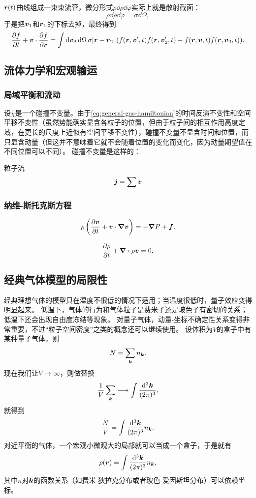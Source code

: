\documentclass[hyperref, UTF8, a4paper]{ctexart}
\begin{document}
$\vb*{r}(t)$曲线组成一束束流管，微分形式$\rho \dd{\rho} \dd{\varphi}$实际上就是散射截面：
\[
    \rho \dd{\rho} \dd{\varphi} = \sigma \dd{\Omega},
\]
于是把$\vb*{v}_1$和$\vb*{r}_1$的下标去掉，最终得到
\begin{equation}
    \pdv{f}{t} + \vb*{v} \cdot \pdv{f}{\vb*{r}} = \int \dd{\vb*{v}_2} \dd{\Omega} \sigma \abs*{\vb*{r}-\vb*{r}_2} (f(\vb*{r}, \vb*{v}', t) f(\vb*{r}, \vb*{v}'_{2}, t) - f(\vb*{r}, \vb*{v}, t) f(\vb*{r}, \vb*{v}_{2}, t)).
\end{equation}

\subsection{流体力学和宏观输运}

\subsubsection{局域平衡和流动}

设$\chi$是一个碰撞不变量。由于\eqref{eq:general-gas-hamiltonian}的时间反演不变性和空间平移不变性（虽然势能确实显含各粒子的位置，但由于粒子间的相互作用高度定域，在更长的尺度上近似有空间平移不变性），碰撞不变量不显含时间和位置，而只显含动量（但这并不意味着它就不会随着位置的变化而变化，因为动量期望值在不同位置可以不同）。
碰撞不变量是这样的：

粒子流
\[
    \vb*{j} = \sum \vb*{v}
\]

\subsubsection{纳维-斯托克斯方程}

\begin{equation}
    \rho \left( \pdv{\vb*{v}}{t} + \vb*{v} \cdot \grad{\vb*{v}} \right) = - \grad{P} + \vb*{f}.
\end{equation}

\begin{equation}
    \pdv{\rho}{t} + \div{\rho \vb*{v}} = 0.
    \label{eq:transportation-eq}
\end{equation}

\subsection{经典气体模型的局限性}

经典理想气体的模型只在温度不很低的情况下适用；当温度很低时，量子效应变得明显起来。
低温下，气体的行为和气体粒子是费米子还是玻色子有密切的关系；低温下还会出现自由度冻结等现象。
对量子气体，动量-坐标不确定性关系变得非常重要，不过“粒子空间密度”之类的概念还可以继续使用。
设体积为$V$的盒子中有某种量子气体，则
\[
    N = \sum_{\vb*{k}} n_{\vb*{k}}.
\]
现在我们让$V\to \infty$，则做替换
\[
    \frac{1}{V} \sum_{\vb*{k}} \longrightarrow \int \frac{\dd[3]{\vb*{k}}}{(2\pi)^3},
\]
就得到
\[
    \frac{N}{V} = \int \frac{\dd[3]{\vb*{k}}}{(2\pi)^3} n_{\vb*{k}}.
\]
对近平衡的气体，一个宏观小微观大的局部就可以当成一个盒子，于是就有
\begin{equation}
    \rho(\vb*{r}) = \int \frac{\dd[3]{\vb*{k}}}{(2\pi)^3} n_{\vb*{k}},
\end{equation}
其中$n$对$\vb*{k}$的函数关系（如费米-狄拉克分布或者玻色-爱因斯坦分布）可以依赖坐标。
\end{document}
